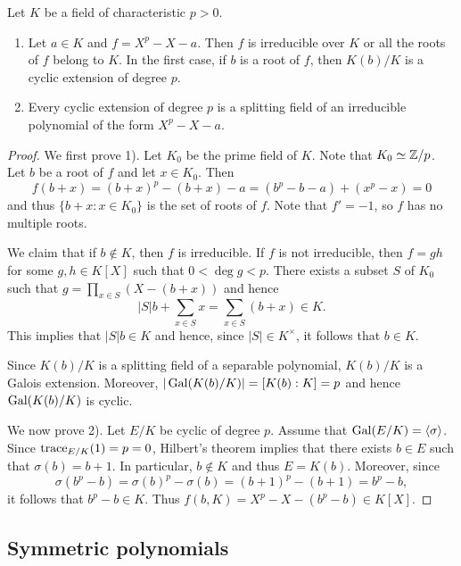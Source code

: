 \begin{proposition}
    Let $K$ be a field of characteristic $p>0$. 
    \begin{enumerate}
        \item Let $a\in K$ and $f=X^p-X-a$. Then 
        $f$ is irreducible over $K$ or all the roots of 
        $f$ belong to $K$. 
        In the first case, if $b$ is a root of $f$, then 
        $K(b)/K$ is a cyclic extension of degree $p$. 
        \item Every cyclic extension of degree $p$ 
        is a splitting field of an irreducible
        polynomial of the form $X^p-X-a$. 
    \end{enumerate}
\end{proposition}

\begin{proof}
    We first prove 1). 
    Let $K_0$ be the prime field of $K$. Note that $K_0\simeq\mathbb{Z}/p$. 
    Let $b$ be a root of $f$ and let $x\in K_0$. 
    Then
    \[
    f(b+x)=(b+x)^p-(b+x)-a
    =(b^p-b-a)+(x^p-x)=0
    \]
    and thus $\{b+x:x\in K_0\}$ is the set of roots of $f$. Note that 
    $f'=-1$, so $f$ has no multiple roots. 
    
    We claim that if $b\not\in K$, then $f$ is irreducible. If 
    $f$ is not irreducible, then 
    $f=gh$ for some $g,h\in K[X]$ such that $0<\deg g<p$. There exists
    a subset $S$ of $K_0$ such that 
    $g=\prod_{x\in S}(X-(b+x))$ and hence
    \[
    |S|b+\sum_{x\in S}x=\sum_{x\in S}(b+x)\in K.
    \]
    This implies that $|S|b\in K$ and hence, since 
    $|S|\in K^{\times}$, it follows that 
    $b\in K$.
    
    Since $K(b)/K$ is a splitting field of a separable polynomial, 
    $K(b)/K$ is a Galois extension. Moreover, 
    $|\operatorname{Gal}(K(b)/K)|=[K(b):K]=p$ and hence 
    $\operatorname{Gal}(K(b)/K)$ is cyclic. 
    
    We now prove 2). Let $E/K$ be cyclic of degree $p$. Assume
    that $\operatorname{Gal}(E/K)=\langle\sigma\rangle$. Since
    $\operatorname{trace}_{E/K}(1)=p=0$, Hilbert's theorem 
    implies that there exists $b\in E$ such that 
    $\sigma(b)=b+1$. In particular, $b\not\in K$
    and thus $E=K(b)$. Moreover, since 
    \[
    \sigma(b^p-b)=\sigma(b)^p-\sigma(b)=(b+1)^p-(b+1)=b^p-b, 
    \]
    it follows that $b^p-b\in K$. Thus 
    $f(b,K)=X^p-X-(b^p-b)\in K[X]$. 
\end{proof}

\subsection{Symmetric polynomials}

